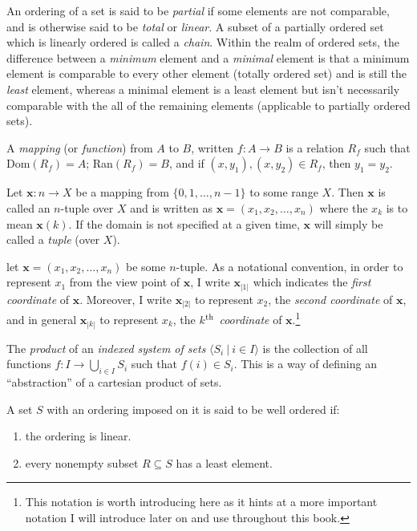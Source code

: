 \documentclass[twoside]{book}
\renewcommand{\th}{$ ^{\mbox{\scriptsize th}} $ }
\newcommand{\coordinate}[1][1]{\ensuremath{{_{|{#1}|}}}}
\renewcommand{\bold}[1][C]{\ensuremath{{\mathbf #1}}}
\newenvironment{definition}[1][Definition]{\begin{trivlist}
\item[\hskip \labelsep {\bfseries Definition (#1):}]}{\end{trivlist}}
\begin{document}
An ordering of a set is said to be \emph{partial} if some elements are not comparable, and is otherwise said to be
\emph{total} or \emph{linear}.  A subset of a partially ordered set which is linearly ordered is called a \emph{chain}.
Within the realm of ordered sets, the difference between a \emph{minimum} element and a \emph{minimal} element is
that a minimum element is comparable to every other element (totally ordered set) and is still the \emph{least} element,
whereas a minimal element is a least element but isn't necessarily comparable with the all of the remaining elements
(applicable to partially ordered sets).

A \emph{mapping} (or \emph{function}) from $ A $ to $ B $, written $ f:A\to B $ is a relation $ R_f $ such that
Dom$ (R_f)=A $; Ran$ (R_f)=B $, and if $ (x, y_1), (x, y_2)\in R_f $, then $ y_1=y_2 $.

Let $ \bold[x]:n\to X $ be a mapping from $ \{0, 1, \ldots, n-1\} $ to some range $ X $.  Then $ \bold[x] $ is
called an $ n $-tuple over $ X $ and is written as $ \bold[x]=(x_1, x_2, \ldots, x_n) $ where the $ x_k $ is to
mean $ \bold[x](k) $.  If the domain is not specified at a given time, $ \bold[x] $ will simply be called a
\emph{tuple} (over $ X $).

let $ \bold[x]=(x_1, x_2, \ldots, x_n) $ be some $ n $-tuple.  As a notational convention, in order
to represent $ x_1 $ from the view point of $ \bold[x] $, I write $ \bold[x]\coordinate $ which indicates the
\emph{first coordinate} of $ \bold[x] $.  Moreover, I write $ \bold[x]\coordinate[2] $ to represent $ x_2 $,
the \emph{second coordinate} of $ \bold[x] $, and in general $ \bold[x]\coordinate[k] $ to represent $ x_k $,
the \emph{$ k $\th coordinate} of $ \bold[x] $.\footnote{This notation is worth introducing here as
it hints at a more important notation I will introduce later on and use throughout this book.}

The \emph{product} of an \emph{indexed system of sets} $ \langle S_i\ |\ i\in I\rangle $ is the collection of all
functions $ f:I\to\bigcup_{i\in I} S_i $ such that $ f(i)\in S_i $.  This is a way of defining an ``abstraction''
of a cartesian product of sets.

\begin{definition}[Well Ordered Set]

A set $ S $ with an ordering imposed on it is said to be well ordered if:

\begin{enumerate}

\item the ordering is linear.

\item every nonempty subset $ R\subseteq S $ has a least element.

\end{enumerate}
\end{definition}
\end{document}
